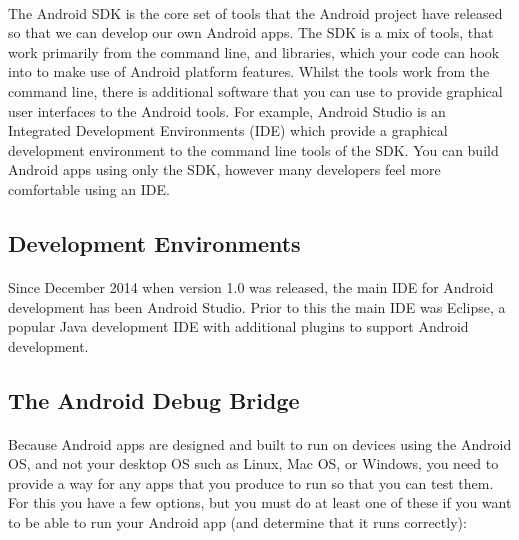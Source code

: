 \documentclass[12pt, a4paper, twoside]{book}
\begin{document}
\paragraph{} The Android SDK is the core set of tools that the Android project have released so that we can develop our own Android apps. The SDK is a mix of tools, that work primarily from the command line, and libraries, which your code can hook into to make use of Android platform features. Whilst the tools work from the command line, there is additional software that you can use to provide graphical user interfaces to the Android tools. For example, Android Studio is an Integrated Development Environments (IDE) which provide a graphical development environment to the command line tools of the SDK. You can build Android apps using only the SDK, however many developers feel more comfortable using an IDE.

\subsection{Development Environments}
\paragraph{} Since December 2014 when version 1.0 was released, the main IDE for Android development has been Android Studio. Prior to this the main IDE was Eclipse, a popular Java development IDE with additional plugins to support Android development. 

\subsection{The Android Debug Bridge}
\paragraph{} Because Android apps are designed and built to run on devices using the Android OS, and not your desktop OS such as Linux, Mac OS, or Windows, you need to provide a way for any apps that you produce to run so that you can test them. For this you have a few options, but you must do at least one of these if you want to be able to run your Android app (and determine that it runs correctly):
\end{document}
